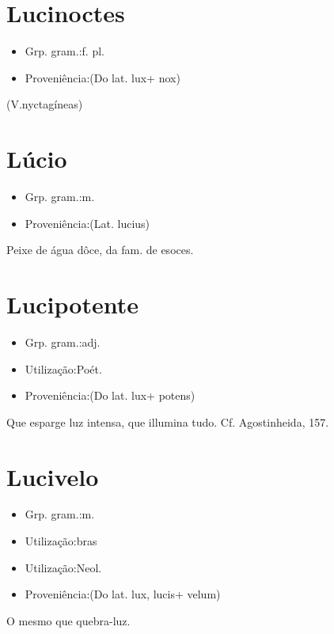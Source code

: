 \section{Lucinoctes}
\begin{itemize}
\item {Grp. gram.:f. pl.}
\end{itemize}
\begin{itemize}
\item {Proveniência:(Do lat. \textunderscore lux\textunderscore  + \textunderscore nox\textunderscore )}
\end{itemize}
(V.nyctagíneas)
\section{Lúcio}
\begin{itemize}
\item {Grp. gram.:m.}
\end{itemize}
\begin{itemize}
\item {Proveniência:(Lat. \textunderscore lucius\textunderscore )}
\end{itemize}
Peixe de água dôce, da fam. de esoces.
\section{Lucipotente}
\begin{itemize}
\item {Grp. gram.:adj.}
\end{itemize}
\begin{itemize}
\item {Utilização:Poét.}
\end{itemize}
\begin{itemize}
\item {Proveniência:(Do lat. \textunderscore lux\textunderscore  + \textunderscore potens\textunderscore )}
\end{itemize}
Que esparge luz intensa, que illumina tudo. Cf. \textunderscore Agostinheida\textunderscore , 157.
\section{Lucivelo}
\begin{itemize}
\item {Grp. gram.:m.}
\end{itemize}
\begin{itemize}
\item {Utilização:bras}
\end{itemize}
\begin{itemize}
\item {Utilização:Neol.}
\end{itemize}
\begin{itemize}
\item {Proveniência:(Do lat. \textunderscore lux\textunderscore , \textunderscore lucis\textunderscore  + \textunderscore velum\textunderscore )}
\end{itemize}
O mesmo que \textunderscore quebra-luz\textunderscore .
